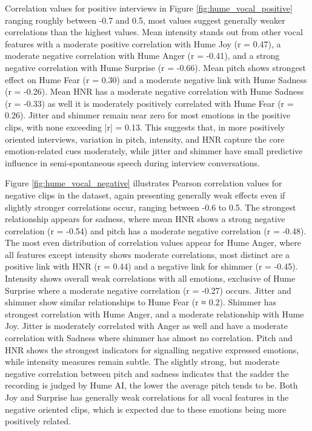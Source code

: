 Correlation values for positive interviews in Figure \ref{fig:hume_vocal_positive} ranging roughly between -0.7 and 0.5, most values suggest generally weaker correlations than the highest values. 
Mean intensity stands out from other vocal features with a moderate positive correlation with Hume Joy (r = 0.47), a moderate negative correlation with Hume Anger (r = -0.41), and a strong negative correlation with Hume Surprise (r = -0.66). 
Mean pitch shows strongest effect on Hume Fear (r = 0.30) and a moderate negative link with Hume Sadness (r = -0.26). 
Mean HNR has a moderate negative correlation with Hume Sadness (r = -0.33) as well it is moderately positively correlated with Hume Fear (r = 0.26). 
Jitter and shimmer remain near zero for most emotions in the positive clips, with none exceeding |r| = 0.13. This suggests that, in more positively oriented interviews, 
variation in pitch, intensity, and HNR capture the core emotion-related cues moderately, while jitter and shimmer have small predictive influence in semi-spontaneous speech during interview conversations. 

Figure \ref{fig:hume_vocal_negative} illustrates Pearson correlation values for negative clips in the dataset, again presenting generally weak effects even if slightly stronger correlations occur, ranging between -0.6 to 0.5. 
The strongest relationship appears for sadness, where mean HNR shows a strong negative correlation (r = -0.54) and pitch has a moderate negative correlation (r = -0.48). The most even distribution of correlation values appear for Hume Anger, 
where all features except intensity shows moderate correlations, most distinct are a positive link with HNR (r = 0.44) and a negative link for shimmer (r = -0.45). Intensity shows overall weak correlations with all emotions, exclusive of Hume Surprise where a moderate negative correlation (r = -0.27) occurs. 
Jitter and shimmer show similar relationships to Hume Fear (r ≈ 0.2). Shimmer has strongest correlation with Hume Anger, and a moderate relationship with Hume Joy. Jitter is moderately correlated with Anger as well and have a moderate correlation with Sadness where shimmer has almost no correlation. 
Pitch and HNR shows the strongest indicators for signalling negative expressed emotions, while intensity measures remain subtle. The slightly strong, but moderate negative correlation between pitch and sadness indicates that the sadder the recording is judged by Hume AI, the lower the average pitch tends to be. 
Both Joy and Surprise has generally weak correlations for all vocal features in the negative oriented clips, which is expected due to these emotions being more positively related. 

